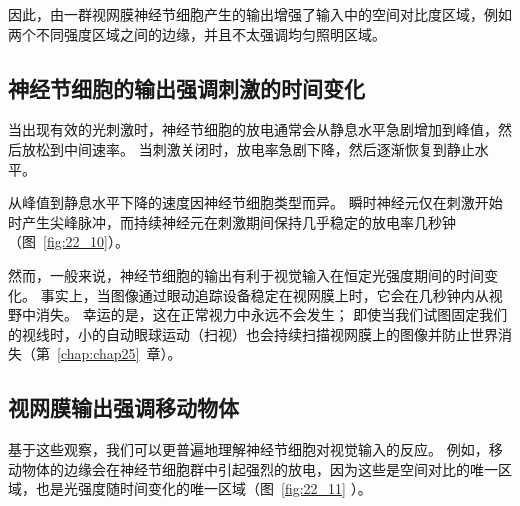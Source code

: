 因此，由一群视网膜神经节细胞产生的输出增强了输入中的空间对比度区域，例如两个不同强度区域之间的边缘，并且不太强调均匀照明区域。



\subsection{神经节细胞的输出强调刺激的时间变化}

当出现有效的光刺激时，神经节细胞的放电通常会从静息水平急剧增加到峰值，然后放松到中间速率。
当刺激关闭时，放电率急剧下降，然后逐渐恢复到静止水平。


从峰值到静息水平下降的速度因神经节细胞类型而异。
瞬时神经元仅在刺激开始时产生尖峰脉冲，而持续神经元在刺激期间保持几乎稳定的放电率几秒钟（图~\ref{fig:22_10}）。


然而，一般来说，神经节细胞的输出有利于视觉输入在恒定光强度期间的时间变化。
事实上，当图像通过眼动追踪设备稳定在视网膜上时，它会在几秒钟内从视野中消失。
幸运的是，这在正常视力中永远不会发生；
即使当我们试图固定我们的视线时，小的自动眼球运动（扫视）也会持续扫描视网膜上的图像并防止世界消失（第~\ref{chap:chap25}~章）。



\subsection{视网膜输出强调移动物体}

基于这些观察，我们可以更普遍地理解神经节细胞对视觉输入的反应。
例如，移动物体的边缘会在神经节细胞群中引起强烈的放电，因为这些是空间对比的唯一区域，也是光强度随时间变化的唯一区域（图~\ref{fig:22_11} ）。


